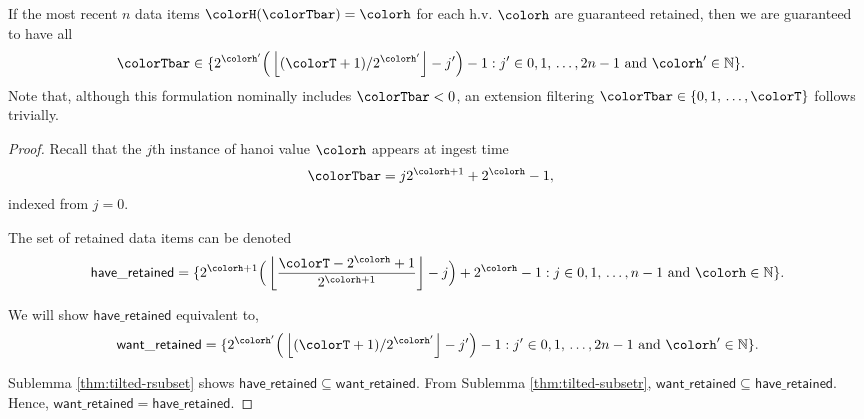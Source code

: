 \begin{lemma}
\label{thm:retained-equivalence-tilted}
If the most recent $n$ data items $\colorH(\colorTbar) = \colorh$ for each h.v. $\colorh$ are guaranteed retained, then we are guaranteed to have all
\begin{align*}
\colorTbar
&\in
\{
  2^{\colorh'}\Big(\left\lfloor (\colorT + 1) / 2^{\colorh'} \right\rfloor - j'\Big) - 1
  :
  j' \in 0,1,\,\ldots,2n-1
  \text{ and }
  \colorh' \in \mathbb{N}
\}.
\end{align*}
Note that, although this formulation nominally includes $\colorTbar < 0$, an extension filtering $\colorTbar \in \{0,1,\,\ldots,\colorT\}$ follows trivially.
\end{lemma}
\begin{proof}

Recall that the $j$th instance of hanoi value $\colorh$ appears at ingest time
\begin{align*}
\colorTbar
&= j2^{\colorh + 1} + 2^{\colorh} - 1,
\end{align*}
indexed from $j=0$.

The set of retained data items can be denoted
\begin{align*}
\mathsf{have\_retained} =
\{
  2^{\colorh + 1}\Big( \left\lfloor\frac{\colorT - 2^{\colorh} + 1}{2^{\colorh + 1}} \right\rfloor - j\Big) + 2^{\colorh} - 1
  :
  j \in 0,1,\,\ldots,n-1
  \text{ and }
  \colorh \in \mathbb{N}
\}.
\end{align*}

We will show $\mathsf{have\_retained}$ equivalent to,
\begin{align*}
\mathsf{want\_retained} =
\{
  2^{\colorh'}\Big(\left\lfloor (\colorT + 1)/ 2^{\colorh'} \right\rfloor - j'\Big) - 1
  :
  j' \in 0,1,\,\ldots,2n-1
  \text{ and }
  \colorh' \in \mathbb{N}
\}.
\end{align*}

Sublemma \ref{thm:tilted-rsubset} shows $\mathsf{have\_retained} \subseteq \mathsf{want\_retained}$.
From Sublemma \ref{thm:tilted-subsetr}, $\mathsf{want\_retained} \subseteq \mathsf{have\_retained}$.
Hence, $\mathsf{want\_retained} = \mathsf{have\_retained}$.

\end{proof}

